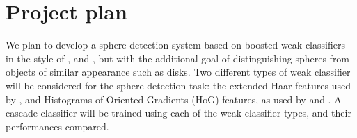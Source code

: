 \documentclass[11pt]{scrartcl}
\begin{document}
    \section{Project plan} {
    \label{sec:plan}



        We plan to develop a sphere detection system based on boosted weak
        classifiers in the style of \citeauthor{zhang2013novel}, and
        \citeauthor{masselli2013haar}, but with the additional goal of
        distinguishing spheres from objects of similar appearance such as
        disks. %
        Two different types of weak classifier will be considered for the sphere detection task: the extended Haar features used by \citet{zhang2013novel},
        and Histograms of Oriented Gradients (HoG) features,
        as used by \citet{dalal2005histograms} and \citet{zhu2006hogs}.
        A cascade classifier will be trained using each of the weak classifier types, and their performances compared.


}
\end{document}
